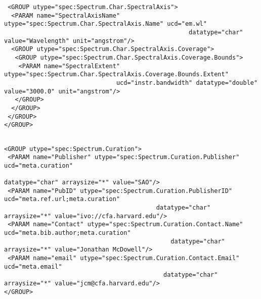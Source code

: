 {\begin{flushleft}
\begin{fmpage}
\begin{verbatim}
 <GROUP utype="spec:Spectrum.Char.SpectralAxis">
  <PARAM name="SpectralAxisName" utype="spec:Spectrum.Char.SpectralAxis.Name" ucd="em.wl" 
                                                   datatype="char" value="Wavelength" unit="angstrom"/>
  <GROUP utype="spec:Spectrum.Char.SpectralAxis.Coverage">
   <GROUP utype="spec:Spectrum.Char.SpectralAxis.Coverage.Bounds">
    <PARAM name="SpectralExtent" utype="spec:Spectrum.Char.SpectralAxis.Coverage.Bounds.Extent" 
                               ucd="instr.bandwidth" datatype="double" value="3000.0" unit="angstrom"/>
   </GROUP>
  </GROUP>
 </GROUP>
</GROUP>

\end{verbatim}
\end{fmpage}

\begin{fmpage}
\begin{verbatim}

<GROUP utype="spec:Spectrum.Curation">
 <PARAM name="Publisher" utype="spec:Spectrum.Curation.Publisher" ucd="meta.curation" 
                                                            datatype="char" arraysize="*" value="SAO"/>
 <PARAM name="PubID" utype="spec:Spectrum.Curation.PublisherID" ucd="meta.ref.url;meta.curation"
                                          datatype="char" arraysize="*" value="ivo://cfa.harvard.edu"/>
 <PARAM name="Contact" utype="spec:Spectrum.Curation.Contact.Name" ucd="meta.bib.author;meta.curation" 
                                              datatype="char" arraysize="*" value="Jonathan McDowell"/>
 <PARAM name="email" utype="spec:Spectrum.Curation.Contact.Email" ucd="meta.email" 
                                            datatype="char" arraysize="*" value="jcm@cfa.harvard.edu"/>
</GROUP>


\end{verbatim}
\end{fmpage}
\end{flushleft}}
